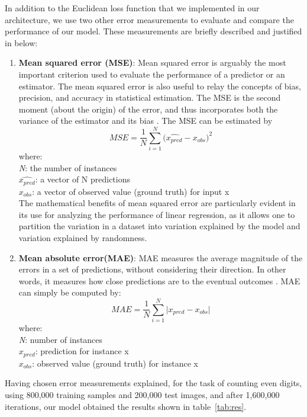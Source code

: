 In addition to the Euclidean loss function that we implemented in our architecture, we use two other error measurements to evaluate and compare the performance of our model. These measurements are briefly described and justified in below:
\begin{enumerate}
\item \textbf{Mean squared error (MSE)}: Mean squared error is arguably the most important criterion used to evaluate the performance of a predictor or an estimator. The mean squared error is also useful to relay the concepts of bias, precision, and accuracy in statistical estimation. The MSE is the second moment (about the origin) of the error, and thus incorporates both the variance of the estimator and its bias \cite{lehmann1998theory}. The MSE can be estimated by
$$MSE = {\frac{1} {N}{\sum\limits_{i = 1}^N {(\hat{x_{pred}} - x_{obs} } })^{2} } $$
where:\\
\textit{N}: the number of instances\\
\textit{ $\hat{x_{pred}}$}: a vector of N predictions\\
\textit{$x_{obs}$}: a vector of observed value (ground truth) for input x\\

The mathematical benefits of mean squared error are particularly evident in its use for analyzing the performance of linear regression, as it allows one to partition the variation in a dataset into variation explained by the model and variation explained by randomness.
\item \textbf{Mean absolute error(MAE)}: MAE measures the average magnitude of the errors in a set of predictions, without considering their direction. In other words, it measures how close predictions are to the eventual outcomes \cite{willmott2005advantages}. MAE can simply be computed by:
$$MAE = {\frac{1} {N}{\sum\limits_{i = 1}^N {|x_{pred} - x_{obs} } }| } $$
where:\\
\textit{N}: number of instances\\
\textit{ $x_{pred}$}: prediction for instance x\\
\textit{$x_{obs}$}: observed value (ground truth) for instance x
\end{enumerate}

\noindent Having chosen error measurements explained, for the task of counting even digits, using 800,000 training samples and 200,000 test images, and after 1,600,000 iterations, our model obtained the results shown in table~\ref{tab:res}.


